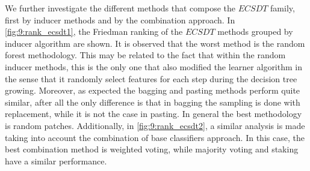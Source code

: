 {  We further investigate the different methods that compose the $ECSDT$ family, first by inducer 
  methods and by the combination approach. In \figurename{ \ref{fig:9:rank_ecsdt1}}, the Friedman 
  ranking of the $ECSDT$ methods grouped by inducer algorithm are shown. It is observed that the 
  worst method is the random forest methodology. This may be related to the fact that within the 
  random inducer methods, this is the only one that also modified the learner algorithm in the 
  sense that it randomly select features for each step during the decision tree growing. Moreover, 
  as expected the bagging and pasting methods perform quite similar, after all the only difference 
  is that in bagging the sampling is done with replacement, while it is not the case in pasting. 
  In  general the best methodology is random patches. Additionally, in \figurename{ 
  \ref{fig:9:rank_ecsdt2}}, a similar analysis is made taking into account the combination of base 
  classifiers approach. In this case, the best combination method is weighted voting, while 
  majority voting and staking have a similar performance.


}
